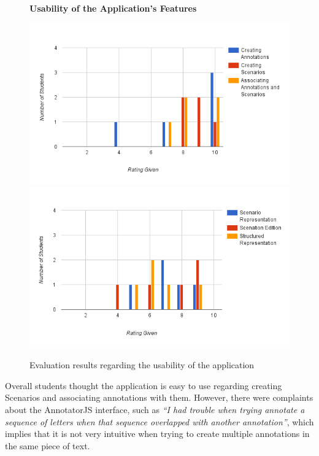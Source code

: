 \begin{figure}[h]
\centering
\begin{normalsize}
\textbf{Usability of the Application's Features}\\
\end{normalsize}
\includegraphics[scale=0.5]{images/graph1}
\includegraphics[scale=0.5]{images/graph2}
\caption{Evaluation results regarding the usability of the application}
\label{figure:usabilityEvaluation}
\end{figure}

Overall students thought the application is easy to use regarding creating Scenarios and associating annotations with them. However, there were complaints about the AnnotatorJS interface, such as \textit{``I had trouble when trying annotate a sequence of letters when that sequence overlapped with another annotation''}, which implies that it is not very intuitive when trying to create multiple annotations in the same piece of text.

